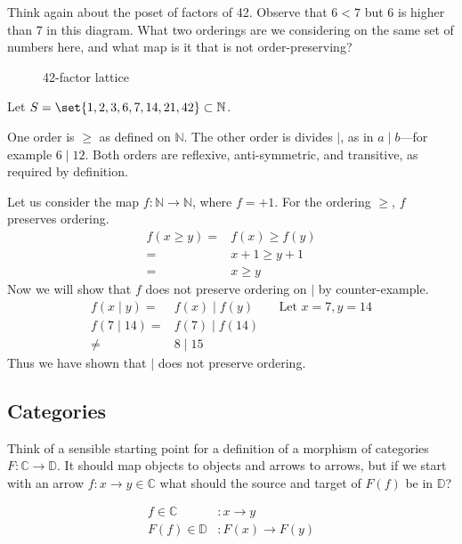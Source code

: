 \begin{ttta}
	Think again about the poset of factors of 42.
	Observe that $6 < 7$ but 6 is higher than 7 in this diagram. What two orderings
	are we considering on the same set of numbers here, and what map is it that is
	not order-preserving?
\end{ttta}
\begin{figure}[H]
	\begin{center}
		
	\end{center}
	\caption{42-factor lattice}
\end{figure}
\begin{proofitem}
	\item Let $S=\set{1,2, 3, 6, 7, 14, 21, 42}\subset \mathbb{N}$.
	\item One order is $\geq$ as defined on $\mathbb{N}$.
	The other order is divides $\mid$, as in $a\mid b$---for example $6\mid 12$.
	Both orders are reflexive, anti-symmetric, and transitive, as required by
	definition.
	\item Let us consider the map $f:\mathbb{N}\rightarrow\mathbb{N}$, where $f=+1$.
	For the ordering $\geq$, $f$ preserves ordering.
	\begin{align*}
		f(x \geq y) = & f(x) \geq f(y) \\
		=             & x+1 \geq y+1   \\
		=             & x \geq y
	\end{align*}
	Now we will show that $f$ does not preserve ordering on $\mid$ by
	counter-example.
	\begin{align*}
		f(x \mid y) =  & f(x) \mid f(y)  &  & \text{Let }x=7, y=14 \\
		f(7 \mid 14) = & f(7) \mid f(14)                           \\
		\neq           & 8 \mid 15
	\end{align*}
	Thus we have shown that $\mid$ does not preserve ordering.
\end{proofitem}

\subsection{Categories}
\begin{ttta}
	Think of a sensible starting point for a definition of a morphism of
	categories $F: \mathbb{C} \longrightarrow \mathbb{D}$. It should map objects to
	objects and arrows to arrows, but if we start with an arrow $f: x \rightarrow
		y\in\mathbb{C}$ what should the source and target of $F(f)$ be in
	$\mathbb{D}$?
\end{ttta}
\begin{proofitem}
	\item
	\begin{align*}
		f\in \mathbb{C}    & : x \rightarrow y       \\
		F(f)\in \mathbb{D} & : F(x) \rightarrow F(y)
	\end{align*}
\end{proofitem}

